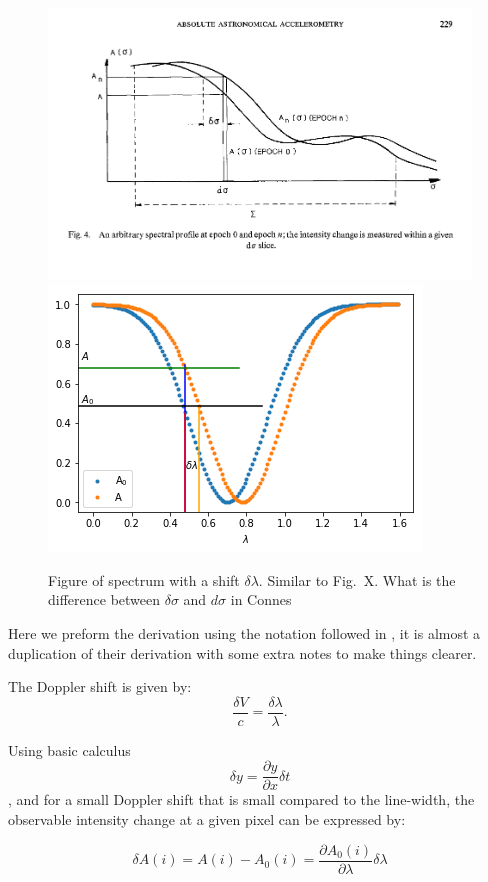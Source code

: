 \begin{figure}
    \centering
     \includegraphics[width=0.7\linewidth]{figures/spectrum_example_a}
    \includegraphics[width=0.7\linewidth]{figures/precision_derivation}

    \caption{Figure of spectrum with a shift $\delta \lambda$. Similar to \citet{Connes1985} Fig.~X. What is the difference between $\delta \sigma$ and $d \sigma$ in Connes}
    \label{fig:precisionderivation}
\end{figure}

Here we preform the derivation using the notation followed in \citet{bouchy_fundamental_2001}, it is almost a duplication of their derivation with some extra notes to make things clearer.


The Doppler shift is given by:
\begin{equation}
\frac{\delta V}{c} = \frac{\delta \lambda}{\lambda}.
\label{eq:dopplershift}
\end{equation}

Using basic calculus \[\delta y = \frac{\partial y}{\partial x} \delta t  \nonumber\], and for a small Doppler shift that is small compared to the line-width, the observable intensity change at a given pixel can be expressed by:

\begin{equation}
\delta A(i) = A(i) - A_0(i) = \frac{\partial A_0(i)}{\partial \lambda} \delta \lambda 
\end{equation}

